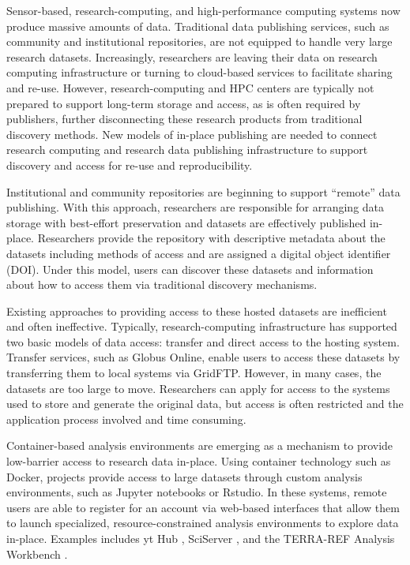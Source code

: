 \documentclass{sig-alternate}
\begin{document}
Sensor-based, research-computing, and high-performance computing systems now produce massive amounts of data.  Traditional data publishing services, such as community and institutional repositories, are not equipped to handle very large research datasets.  Increasingly, researchers are leaving their data on research computing infrastructure or turning to cloud-based services to facilitate sharing and re-use. However, research-computing and HPC centers are typically not prepared to support long-term storage and access, as is often required by publishers, further disconnecting these research products from traditional discovery methods. New models of in-place publishing are needed to connect research computing and research data publishing infrastructure to support discovery and access for re-use and reproducibility.

Institutional and community repositories are beginning to support ``remote'' data publishing.  With this approach, researchers are responsible for arranging data storage with best-effort preservation and datasets are effectively published in-place. Researchers provide the repository with descriptive metadata about the datasets including methods of access and are assigned a digital object identifier (DOI).  Under this model, users can discover these datasets and information about how to access them via traditional discovery mechanisms. 

Existing approaches to providing access to these hosted datasets are inefficient and often ineffective.  Typically, research-computing infrastructure has supported two basic models of data access: transfer and direct access to the hosting system.  Transfer services, such as Globus Online, enable users to access these datasets by transferring them to local systems via GridFTP.  However, in many cases, the datasets are too large to move. Researchers can apply for access to the systems used to store and generate the original data, but access is often restricted and the application process involved and time consuming.

Container-based analysis environments are emerging as a mechanism to provide low-barrier access to research data in-place.  Using container technology such as Docker, projects provide access to large datasets through custom analysis environments, such as Jupyter notebooks or Rstudio.  In these systems, remote users are able to register for an account via web-based interfaces that allow them to launch specialized, resource-constrained analysis environments to explore data in-place. Examples includes yt Hub \cite{smith2011}, SciServer \cite{Medvedev:2016:SCB:2949689.2949700}, and the TERRA-REF Analysis Workbench \cite{willis_craig_2017_580057}.
\end{document}
